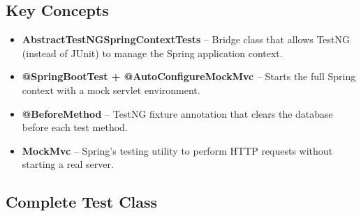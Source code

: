 \documentclass[12pt,a4paper]{article}
\begin{document}
\subsection{Key Concepts}
\begin{itemize}
    \item \textbf{AbstractTestNGSpringContextTests} -- Bridge class that allows TestNG (instead of JUnit) to manage the Spring application context.
    \item \textbf{@SpringBootTest + @AutoConfigureMockMvc} -- Starts the full Spring context with a mock servlet environment.
    \item \textbf{@BeforeMethod} -- TestNG fixture annotation that clears the database before each test method.
    \item \textbf{MockMvc} -- Spring's testing utility to perform HTTP requests without starting a real server.
\end{itemize}

\subsection{Complete Test Class}
\end{document}
